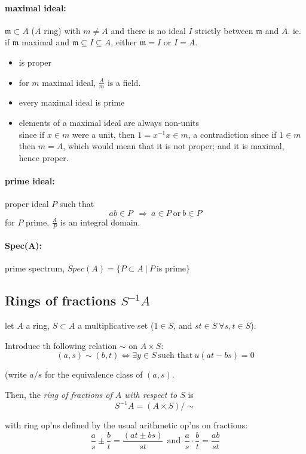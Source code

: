 \documentclass{article}
\theoremstyle{definition}
\newenvironment{defn}[1]
{\renewcommand\theinnerdefn{#1}\innerdefn}
{\endinnerdefn}
\newcommand{\mM}{\mathfrak{m}}
\begin{document}
\paragraph{maximal ideal:}
$\mM \subset A$ ($A$ ring) with $m \neq A$ and there is no ideal $I$ strictly between $\mM$ and $A$. ie. if $\mM$ maximal and $\mM \subseteq I \subseteq A$, either $\mM=I$ or $I=A$.
\begin{itemize}
  \item is proper
  \item for $m$ maximal ideal, $\frac{A}{m}$ is a field.
  \item every maximal ideal is prime
  \item elements of a maximal ideal are always non-units\\
    \hspace*{2em} since if $x \in m$ were a unit, then $1=x^{-1}x \in m$, a contradiction since if $1 \in m$ then $m=A$, which would mean that it is not proper; and it is maximal, hence proper.
\end{itemize}

\paragraph{prime ideal:} proper ideal $P$ such that
$$ab \in P ~~\Longrightarrow~ a \in P ~\text{or}~ b \in P$$
for $P$ prime, $\frac{A}{P}$ is an integral domain.

\paragraph{Spec(A):} prime spectrum, $Spec(A)=\{ P \subset A ~|~ P ~\text{is prime}\}$


\vspace{0.6cm}



\subsection{Rings of fractions $S^{-1}A$}

\begin{defn}{6.1}[ring of fractions] \label{def.6.1}
  let $A$ a ring, $S \subset A$ a multiplicative set ($1 \in S$, and $st \in S
  ~\forall s, t \in S$).

  Introduce th following relation $\sim$ on $A \times S$:
  $$(a, s) \sim (b, t) \Longleftrightarrow \exists y \in S ~\text{such that}~ u(at - bs) = 0$$

  (write $a/s$ for the equivalence class of $(a, s)$.

  Then, the \emph{ring of fractions of $A$ with respect to $S$} is
  $$S^{-1}A = (A \times S)/\sim$$

  with ring op'ns defined by the usual arithmetic op'ns on fractions:
  $$\frac{a}{s} \pm \frac{b}{t} = \frac{(at \pm bs)}{st} ~~\text{and}~~ \frac{a}{s} \cdot \frac{b}{t} = \frac{ab}{st}$$
\end{defn}
\end{document}
